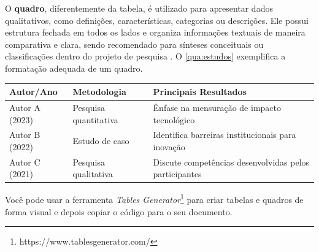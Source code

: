 



O \textbf{quadro}, diferentemente da tabela, é utilizado para apresentar dados qualitativos, como definições, características, categorias ou descrições. Ele possui estrutura fechada em todos os lados e organiza informações textuais de maneira comparativa e clara, sendo recomendado para sínteses conceituais ou classificações dentro do projeto de pesquisa \cite{ABNT_NBR14724_2011,ABNT_NBR15287_2011,ABNT_NBR6024_2012}. O \autoref{qua:estudos} exemplifica a formatação adequada de um quadro.


\begin{quadro}[htbp]  %
    \centering
    \caption{Exemplo de quadro, com conteudo qualitativo}
    \label{qua:estudos}
    \begin{tabularx}{\textwidth}{|p{3cm}|p{4cm}|X|} %
        \hline
        \textbf{Autor/Ano} & \textbf{Metodologia} & \textbf{Principais Resultados} \\
        \hline
        Autor A (2023) & Pesquisa quantitativa & Ênfase na mensuração de impacto tecnológico \\ \hline
        Autor B (2022) & Estudo de caso & Identifica barreiras institucionais para inovação \\ \hline
        Autor C (2021) & Pesquisa qualitativa & Discute competências desenvolvidas pelos participantes \\ \hline
    \end{tabularx}
\end{quadro}

Você pode usar a ferramenta \textit{Tables Generator}\footnote{https://www.tablesgenerator.com/} para criar tabelas e quadros de forma visual e depois copiar o código para o seu documento.

